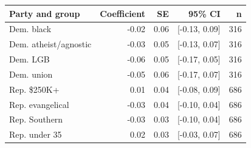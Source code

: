 
\begin{tabular}{lrrrr}
\toprule
Party and group & Coefficient & SE & 95\% CI & n\\
\midrule
Dem. black & -0.02 & 0.06 & {}[-0.13, 0.09] & 316\\
Dem. atheist/agnostic & -0.03 & 0.05 & {}[-0.13, 0.07] & 316\\
Dem. LGB & -0.06 & 0.05 & {}[-0.17, 0.05] & 316\\
Dem. union & -0.05 & 0.06 & {}[-0.17, 0.07] & 316\\
Rep. \$250K+ & 0.01 & 0.04 & {}[-0.08, 0.09] & 686\\
Rep. evangelical & -0.03 & 0.04 & {}[-0.10, 0.04] & 686\\
Rep. Southern & -0.03 & 0.03 & {}[-0.10, 0.04] & 686\\
Rep. under 35 & 0.02 & 0.03 & {}[-0.03, 0.07] & 686\\
\bottomrule
\end{tabular}
